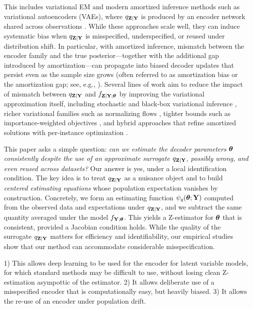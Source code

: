 \documentclass[twoside,11pt]{article}
\begin{document}
This includes variational EM and modern amortized inference methods such as variational autoencoders (VAEs), where $q_{{\bf Z}\mid{\bf Y}}$ is produced by an encoder network shared across observations \citep{dempster1977maximum,jordan1999introduction,kingma2014autoencoding,blei2017variational}.
While these approaches scale well, they can induce systematic bias when $q_{{\bf Z}\mid{\bf Y}}$ is misspecified, underspecified, or reused under distribution shift.
In particular, with amortized inference, mismatch between the encoder family and the true posterior---together with the additional gap introduced by amortization---can propagate into biased decoder updates that persist even as the sample size grows (often referred to as amortization bias or the amortization gap; see, e.g., \citealp{cremer2018inference}).
Several lines of work aim to reduce the impact of mismatch between $q_{{\bf Z}\mid{\bf Y}}$ and $f_{{\bf Z}\mid{\bf Y};{\bm{\theta}}}$ by improving the variational approximation itself, including stochastic and black-box variational inference \citep{hoffman2013svi,ranganath2014bbvi}, richer variational families such as normalizing flows \citep{rezende2015flows}, tighter bounds such as importance-weighted objectives \citep{burda2016iwae}, and hybrid approaches that refine amortized solutions with per-instance optimization \citep{kim2018semiamortized}.

This paper asks a simple question:
\emph{can we estimate the decoder parameters ${\bm{\theta}}$ consistently despite the use of an approximate surrogate $q_{{\bf Z}\mid{\bf Y}}$, possibly wrong, and even reused across datasets?}
Our answer is yes, under a local identification condition.
The key idea is to treat $q_{{\bf Z}\mid{\bf Y}}$ as a nuisance object and to build \emph{centered estimating equations} whose population expectation vanishes by construction.
Concretely, we form an estimating function $\psi_q({\bm{\theta}};{\bf Y})$ computed from the observed data and expectations under $q_{{\bf Z}\mid{\bf Y}}$, and we subtract the same quantity averaged under the model $f_{{\bf Y};{\bm{\theta}}}$. This yields a Z-estimator \citep{vandervaart1998} for ${\bm{\theta}}$ that is consistent, provided a Jacobian condition holds. While the quality of the surrogate $q_{{\bf Z}\mid{\bf Y}}$ matters for efficiency and identifiability, our empirical studies show that our method can accommodate considerable  misspecification. 

1) This allows deep learning to be used for the encoder for latent variable models, for which standard methods may be difficult to use, without losing clean Z-estimation asympottic of the estimator.
2) It allows deliberate use of a misspecified encoder that is computationally easy, but heavily biased.
3) It allows the re-use of an encoder under population drift.
\end{document}

